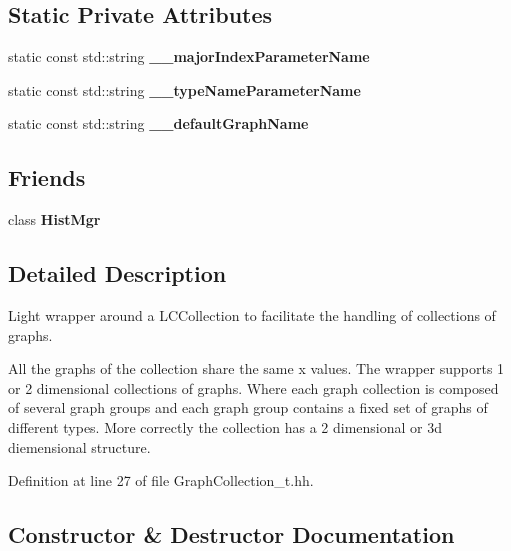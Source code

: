 \subsection*{Static Private Attributes}
\begin{DoxyCompactItemize}
\item 
static const std\-::string {\bfseries \-\_\-\-\_\-major\-Index\-Parameter\-Name}\label{classhistmgr_1_1GraphCollection__t_adaba3b377fc3c74c4b34fcae6b032849}

\item 
static const std\-::string {\bfseries \-\_\-\-\_\-type\-Name\-Parameter\-Name}\label{classhistmgr_1_1GraphCollection__t_aab8c996982d62a8eab7cd537394a07b1}

\item 
static const std\-::string {\bfseries \-\_\-\-\_\-default\-Graph\-Name}\label{classhistmgr_1_1GraphCollection__t_ad7c3d4148ee7dcfbab8485fb3e7872c0}

\end{DoxyCompactItemize}
\subsection*{Friends}
\begin{DoxyCompactItemize}
\item 
class {\bfseries Hist\-Mgr}\label{classhistmgr_1_1GraphCollection__t_a3cc85db784d7651390e41024125eb3a0}

\end{DoxyCompactItemize}


\subsection{Detailed Description}
Light wrapper around a L\-C\-Collection to facilitate the handling of collections of graphs. 

All the graphs of the collection share the same x values. The wrapper supports 1 or 2 dimensional collections of graphs. Where each graph collection is composed of several graph groups and each graph group contains a fixed set of graphs of different types. More correctly the collection has a 2 dimensional or 3d diemensional structure. 

Definition at line 27 of file Graph\-Collection\-\_\-t.\-hh.



\subsection{Constructor \& Destructor Documentation}
